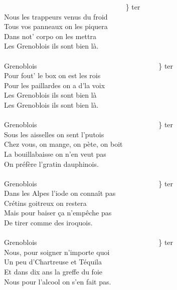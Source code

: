 
~~~~~~~~~~~~~~~~~~~~~~~~~~~~~~~~~~ \} ter
\\Nous les trappeurs venus du froid
\\Tous vos panneaux on les piquera
\\Dans not' corpo on les mettra
\\Les Grenoblois ils sont bien là.
\\\\Grenoblois ~~~~~~~~~~~~~~~~~~~~~~~~~~~~~~~~~~\} ter
\\Pour fout' le box on est les rois
\\Pour les paillardes on a d'la voix
\\Les Grenoblois ils sont bien là
\\Les Grenoblois ils sont bien là.
\\\\Grenoblois ~~~~~~~~~~~~~~~~~~~~~~~~~~~~~~~~~~\} ter
\\Sous les aisselles on sent l'putois
\\Chez vous, on mange, on pète, on boit
\\La bouillabaisse on n'en veut pas
\\On préfère l'gratin dauphinois.
\\\\Grenoblois ~~~~~~~~~~~~~~~~~~~~~~~~~~~~~~~~~~\} ter
\\Dans les Alpes l'iode on connaît pas
\\Crétins goitreux on restera
\\Mais pour baiser ça n'empêche pas
\\De tirer comme des iroquois.
\\\\Grenoblois ~~~~~~~~~~~~~~~~~~~~~~~~~~~~~~~~~~\} ter
\\Nous, pour soigner n'importe quoi
\\Un peu d'Chartreuse et Téquila
\\Et dans dix ans la greffe du foie
\\Nous pour l'alcool on s'en fait pas.
\\\\
\\\\
\\
\breakpage